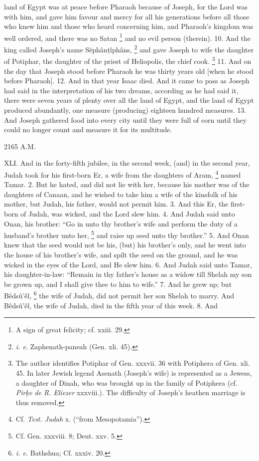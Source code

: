 land of Egypt was at peace before Pharaoh because of Joseph, for the Lord was with him, and gave him favour and mercy for all his generations before all those who knew him and those who heard concerning him, and Pharaoh's kingdom was well ordered, and there was no Satan \footnote{A sign of great felicity; cf. xxiii. 29.} and no evil person (therein). 10. And the king called Joseph's name Sĕphân\d{t}îphâns, \footnote{\emph{i. e.} Zaphenath-paneah (Gen. xli. 45).} and gave Joseph to wife the daughter of Potiphar, the daughter of the priest of Heliopolis, the chief cook. \footnote{The author identifies Potiphar of Gen. xxxvii. 36 with Potiphera of Gen. xli. 45. In later Jewish legend Asenath (Joseph's wife) is represented as a Jewess, a daughter of Dinah, who was brought up in the family of Potiphera (cf. \emph{Pir\d{k}e de R. Eliezer} xxxviii.). The difficulty of Joseph's heathen marriage is thus removed.} 11. And on the day that Joseph stood before Pharaoh he was thirty years old [when he stood before Pharaoh]. 12. And in that year Isaac died. And it came to pass as Joseph had said in the interpretation of his two dreams, according as he had said it, there were seven years of plenty over all the land of Egypt, and the land of Egypt produced abundantly, one measure (producing) eighteen hundred measures. 13. And Joseph gathered food into every city until they were full of corn until they could no longer count and measure it for its multitude.


2165 A.M.

XLI. And in the forty-fifth jubilee, in the second week, (and) in the second year, Judah took for his first-born Er, a wife from the daughters of Aram, \footnote{Cf. \emph{Test. Judah} x. (``from Mesopotamia'').} named Tamar. 2. But he hated, and did not lie with her, because his mother was of the daughters of Canaan, and he wished to take him a wife of the kinsfolk of his mother, but Judah, his father, would not permit him. 3. And this Er, the first-born of Judah, was wicked, and the Lord slew him. 4. And Judah said unto Onan, his brother: ``Go in unto thy brother's wife and perform the duty of a husband's brother unto her, \footnote{Cf. Gen. xxxviii. 8; Deut. xxv. 5.} and raise up seed unto thy brother.'' 5. And Onan knew that the seed would not be his, (but) his brother's only, and he went into the house of his brother's wife, and spilt the seed on the ground, and he was wicked in the eyes of the Lord, and He slew him. 6. And Judah said unto Tamar, his daughter-in-law: ``Remain in thy father's house as a widow till Shelah my son be grown up, and I shall give thee to him to wife.'' 7. And he grew up; but Bêdsû’êl, \footnote{\emph{i. e.} Bathshua; Cf. xxxiv. 20.} the wife of Judah, did not permit her son Shelah to marry. And Bêdsû’êl, the wife of Judah, died in the fifth year of this week. 8. And

